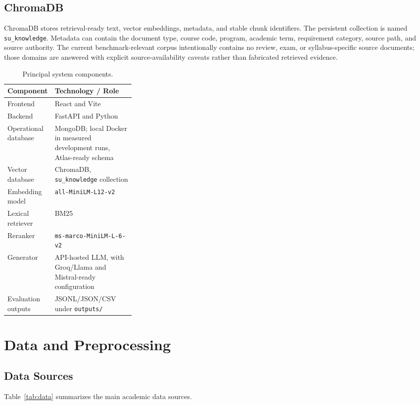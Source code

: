 \documentclass[10pt,a4paper]{article}
\newcommand{\code}[1]{\texttt{\small #1}}
\begin{document}
\subsection{ChromaDB}

ChromaDB stores retrieval-ready text, vector embeddings, metadata, and stable chunk identifiers. The persistent collection is named \code{su\_knowledge}. Metadata can contain the document type, course code, program, academic term, requirement category, source path, and source authority. The current benchmark-relevant corpus intentionally contains no review, exam, or syllabus-specific source documents; those domains are answered with explicit source-availability caveats rather than fabricated retrieved evidence.

\begin{table}[H]
\centering
\caption{Principal system components.}
\label{tab:components}
\small
\begin{tabularx}{\linewidth}{p{0.30\linewidth}Y}
\toprule
\textbf{Component} & \textbf{Technology / Role}\\
\midrule
Frontend & React and Vite\\
Backend & FastAPI and Python\\
Operational database & MongoDB; local Docker in measured development runs, Atlas-ready schema\\
Vector database & ChromaDB, \code{su\_knowledge} collection\\
Embedding model & \code{all-MiniLM-L12-v2}\\
Lexical retriever & BM25\\
Reranker & \code{ms-marco-MiniLM-L-6-v2}\\
Generator & API-hosted LLM, with Groq/Llama and Mistral-ready configuration\\
Evaluation outputs & JSONL/JSON/CSV under \code{outputs/}\\
\bottomrule
\end{tabularx}
\end{table}

\section{Data and Preprocessing}

\subsection{Data Sources}

Table~\ref{tab:data} summarizes the main academic data sources.
\end{document}
